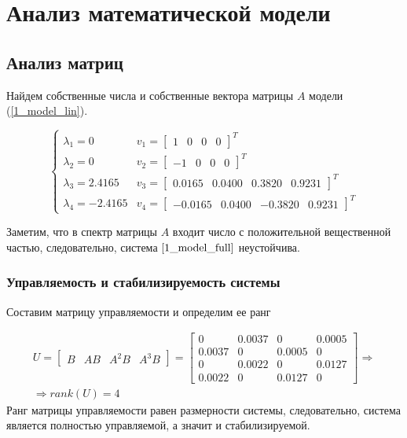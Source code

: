 \chapter{Анализ математической модели}
\label{ch:chap2}

\section{Анализ матриц}
Найдем собственные числа и собственные вектора матрицы $A$ модели (\ref{1_model_lin}).

\begin{equation}
    \begin{cases}
        \lambda_1 = 0 & v_1 = \begin{bmatrix}
            1 & 0 & 0 & 0
        \end{bmatrix}^T\\
         \lambda_2 = 0&  v_2 = \begin{bmatrix}
            -1 & 0 & 0 & 0
        \end{bmatrix}^T\\
         \lambda_3 = 2.4165 & v_3 = \begin{bmatrix}
            0.0165 & 0.0400 & 0.3820 & 0.9231
        \end{bmatrix}^T\\
         \lambda_4 = -2.4165 & v_4 = \begin{bmatrix}
            -0.0165 & 0.0400 & -0.3820 & 0.9231
        \end{bmatrix}^T
    \end{cases}
\end{equation}

Заметим, что в спектр матрицы $A$ входит число с положительной вещественной частью, следовательно, система $\ref{1_model_full}$ неустойчива.

\subsection{Управляемость и стабилизируемость системы}
Составим матрицу управляемости и определим ее ранг

\begin{multline}
    U = \begin{bmatrix}
        B & AB & A^2B&A^3B
    \end{bmatrix} = \begin{bmatrix}
        0 &   0.0037  &       0  &  0.0005\\
    0.0037      &   0   & 0.0005   &      0\\
         0   & 0.0022   &      0  &  0.0127\\
    0.0022     &    0 &   0.0127   &      0
    \end{bmatrix} \Rightarrow\\
    \Rightarrow rank(U) = 4
\end{multline}
Ранг матрицы управляемости равен размерности системы, следовательно, система является полностью управляемой, а значит и стабилизируемой.


